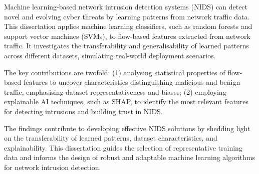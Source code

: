 Machine learning-based network intrusion detection systems (NIDS) can detect novel and evolving cyber threats by learning patterns from network traffic data. This dissertation applies machine learning classifiers, such as random forests and support vector machines (SVMs), to flow-based features extracted from network traffic. It investigates the transferability and generalisability of learned patterns across different datasets, simulating real-world deployment scenarios.

\noindent The key contributions are twofold: (1) analysing statistical properties of flow-based features to uncover characteristics distinguishing malicious and benign traffic, emphasising dataset representativeness and biases; (2) employing explainable AI techniques, such as SHAP, to identify the most relevant features for detecting intrusions and building trust in NIDS.\@

\noindent The findings contribute to developing effective NIDS solutions by shedding light on the transferability of learned patterns, dataset characteristics, and explainability. This dissertation guides the selection of representative training data and informs the design of robust and adaptable machine learning algorithms for network intrusion detection.